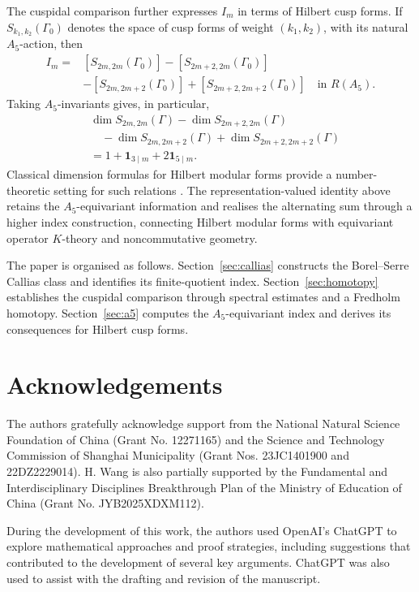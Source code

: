 \documentclass[11pt]{article}
\theoremstyle{definition}
\theoremstyle{plain}
\numberwithin{equation}{section}
\begin{document}
The cuspidal comparison further expresses $I_m$
in terms of Hilbert cusp forms. If
$S_{k_1,k_2}(\Gamma_0)$ denotes the space of
cusp forms of weight $(k_1,k_2)$, with its
natural $A_5$-action, then
\[
\begin{aligned}
 I_m={}&[S_{2m,2m}(\Gamma_0)]
       -[S_{2m+2,2m}(\Gamma_0)]\\
      &-[S_{2m,2m+2}(\Gamma_0)]
       +[S_{2m+2,2m+2}(\Gamma_0)]
       \quad\text{in }R(A_5).
\end{aligned}
\]
Taking $A_5$-invariants gives, in particular,
\[
\begin{aligned}
 &\dim S_{2m,2m}(\Gamma)
 -\dim S_{2m+2,2m}(\Gamma)\\
 &\quad-\dim S_{2m,2m+2}(\Gamma)
 +\dim S_{2m+2,2m+2}(\Gamma)\\
 &=1+\mathbf1_{3\mid m}
      +2\mathbf1_{5\mid m}.
\end{aligned}
\]
Classical dimension formulas for Hilbert modular
forms provide a number-theoretic setting for
such relations \cite{Hirzebruch73}. The
representation-valued identity above retains
the $A_5$-equivariant information and realises
the alternating sum through a higher index
construction, connecting Hilbert modular forms
with equivariant operator $K$-theory and
noncommutative geometry.

The paper is organised as follows.
Section~\ref{sec:callias} constructs the
Borel--Serre Callias class and identifies its
finite-quotient index.
Section~\ref{sec:homotopy} establishes the
cuspidal comparison through spectral estimates
and a Fredholm homotopy.
Section~\ref{sec:a5} computes the
$A_5$-equivariant index and derives its
consequences for Hilbert cusp forms.



\section*{Acknowledgements}

The authors gratefully acknowledge support from the
National Natural Science Foundation of China
(Grant No. 12271165) and the Science and Technology
Commission of Shanghai Municipality
(Grant Nos. 23JC1401900 and 22DZ2229014).
H. Wang is also partially supported by the Fundamental
and Interdisciplinary Disciplines Breakthrough Plan
of the Ministry of Education of China
(Grant No. JYB2025XDXM112).

During the development of this work, the authors used
OpenAI's ChatGPT to explore mathematical approaches
and proof strategies, including suggestions that
contributed to the development of several key arguments.
ChatGPT was also used to assist with the drafting and
revision of the manuscript.
\end{document}
